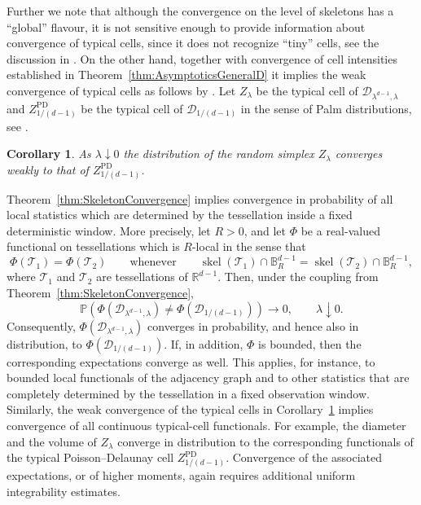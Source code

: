 \documentclass[11pt,a4paper]{article}
\theoremstyle{plain}
\newtheorem{corollary}[theorem]{Corollary}
\theoremstyle{definition}
\theoremstyle{remark}
\newcommand{\skel}{\mathop{\mathrm{skel}}\nolimits}
\def\BB{\mathbb{B}}
\def\PP{\mathbb{P}}
\def\RR{\mathbb{R}}
\def\cD{\mathcal{D}}
\def\cT{\mathcal{T}}
\begin{document}
Further we note that although the convergence on the level of skeletons has a ``global'' flavour, it is not sensitive enough to provide information about convergence of typical cells, since it does not recognize ``tiny'' cells, see the discussion in \cite{GiWL26}. On the other hand, together with convergence of cell intensities established in Theorem~\ref{thm:AsymptoticsGeneralD} it implies the weak convergence of typical cells as follows by \cite[Proposition 6.3]{GKT24}. Let $Z_{\lambda}$ be the typical cell of $\cD_{\lambda^{d-1},\lambda}$ and $Z^{\operatorname{PD}}_{1/(d-1)}$ be the typical cell of $\cD_{1/(d-1)}$ in the sense of Palm distributions, see \cite[Chapter 10]{SW}.

\begin{corollary}\label{cor:TypicalCellConvergence}
	As $\lambda\downarrow 0$ the distribution of the random simplex $Z_{\lambda}$ converges weakly to that of $Z^{\operatorname{PD}}_{1/(d-1)}$.
\end{corollary}


Theorem~\ref{thm:SkeletonConvergence} implies convergence in probability of all local
statistics which are determined by the tessellation inside a fixed
deterministic window. More precisely, let $R>0$, and let $\Phi$ be a
real-valued functional on tessellations which is $R$-local in the sense
that
\[
	\Phi(\cT_1)=\Phi(\cT_2)
	\qquad\text{whenever}\qquad
	\skel(\cT_1)\cap\BB_R^{d-1}
	=
	\skel(\cT_2)\cap\BB_R^{d-1},
\]
where $\cT_1$ and $\cT_2$ are tessellations of $\RR^{d-1}$. Then,
under the coupling from Theorem~\ref{thm:SkeletonConvergence},
\[
	\PP\left(
	\Phi(\cD_{\lambda^{d-1},\lambda})
	\neq
	\Phi(\cD_{1/(d-1)})
	\right)
	\longrightarrow0,
	\qquad \lambda\downarrow0.
\]
Consequently,
$\Phi(\cD_{\lambda^{d-1},\lambda})$ converges in probability, and hence
also in distribution, to $\Phi(\cD_{1/(d-1)})$. If, in addition,
$\Phi$ is bounded, then the corresponding expectations converge as well.
This applies, for instance, to bounded local functionals of the adjacency
graph and to other statistics that are completely determined by the
tessellation in a fixed observation window. Similarly, the weak convergence of the typical cells in
Corollary~\ref{cor:TypicalCellConvergence} implies convergence of all continuous typical-cell functionals.  For example, the diameter and the volume of $Z_\lambda$ converge in
distribution to the corresponding functionals of the typical
Poisson--Delaunay cell $Z_{1/(d-1)}^{\operatorname{PD}}$. Convergence of the associated expectations, or of higher moments, again requires additional uniform integrability estimates.
\end{document}

